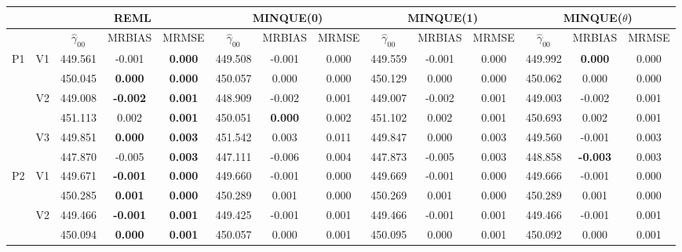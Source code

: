 \documentclass[12pt,a4paper]{article}
\begin{document}
\begin{sidewaystable}[ht]
\centering
{\footnotesize
\begin{tabular}{cc|ccc|ccc|ccc|ccc|}
   & & \multicolumn{3}{c|}{REML}&\multicolumn{3}{c|}{MINQUE(0)}&\multicolumn{3}{c|}{MINQUE(1)}&\multicolumn{3}{c|}{MINQUE($\theta$)}\\ \hline
 &  & $\hat{\gamma}_{00}$ & MRBIAS & MRMSE & $\hat{\gamma}_{00}$ & MRBIAS & MRMSE & $\hat{\gamma}_{00}$ & MRBIAS & MRMSE & $\hat{\gamma}_{00}$ & MRBIAS & MRMSE \\ 
  \hline
\multirow{6}{*}{P1} & \multirow{2}{*}{V1} & 449.561 & -0.001 & \textbf{0.000} & 449.508 & -0.001 & 0.000 & 449.559 & -0.001 & 0.000 & 449.992 & \textbf{0.000} & 0.000 \\ 
   &  & 450.045 & \textbf{0.000} & \textbf{0.000} & 450.057 & 0.000 & 0.000 & 450.129 & 0.000 & 0.000 & 450.062 & 0.000 & 0.000 \\ 
   & \multirow{2}{*}{V2} & 449.008 & \textbf{-0.002} & \textbf{0.001} & 448.909 & -0.002 & 0.001 & 449.007 & -0.002 & 0.001 & 449.003 & -0.002 & 0.001 \\ 
   &  & 451.113 & 0.002 & \textbf{0.001} & 450.051 & \textbf{0.000} & 0.002 & 451.102 & 0.002 & 0.001 & 450.693 & 0.002 & 0.001 \\ 
   & \multirow{2}{*}{V3} & 449.851 & \textbf{0.000} & \textbf{0.003} & 451.542 & 0.003 & 0.011 & 449.847 & 0.000 & 0.003 & 449.560 & -0.001 & 0.003 \\ 
   &  & 447.870 & -0.005 & \textbf{0.003} & 447.111 & -0.006 & 0.004 & 447.873 & -0.005 & 0.003 & 448.858 & \textbf{-0.003} & 0.003 \\ 
   \hline \hline\multirow{6}{*}{P2} & \multirow{2}{*}{V1} & 449.671 & \textbf{-0.001} & \textbf{0.000} & 449.660 & -0.001 & 0.000 & 449.669 & -0.001 & 0.000 & 449.666 & -0.001 & 0.000 \\ 
   &  & 450.285 & \textbf{0.001} & \textbf{0.000} & 450.289 & 0.001 & 0.000 & 450.269 & 0.001 & 0.000 & 450.289 & 0.001 & 0.000 \\ 
   & \multirow{2}{*}{V2} & 449.466 & \textbf{-0.001} & \textbf{0.001} & 449.425 & -0.001 & 0.001 & 449.466 & -0.001 & 0.001 & 449.466 & -0.001 & 0.001 \\ 
   &  & 450.094 & \textbf{0.000} & \textbf{0.001} & 450.057 & 0.000 & 0.001 & 450.095 & 0.000 & 0.001 & 450.092 & 0.000 & 0.001 \\ 

\end{tabular}}
\end{sidewaystable}
\end{document}
